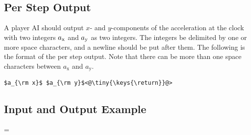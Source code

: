 \documentclass[11pt]{article}
\begin{document}
\subsection{Per Step Output}
A player AI should output $x$- and $y$-components of the
acceleration at the clock with two integers $a_{\rm x}$ and $a_{\rm
  y}$ as two integers.
The integers be delimited by one or more space characters, and a newline should be put after them.
The following is the format of the per step output.
Note that there can be more than one space characters between $a_\mathrm{x}$ and $a_\mathrm{y}$.

\begin{lstlisting}
$a_{\rm x}$ $a_{\rm y}$<@\tiny{\keys{\return}}@>
\end{lstlisting}

\subsection{Input and Output Example}

\newlength{}
{}=\parindent
\end{document}
